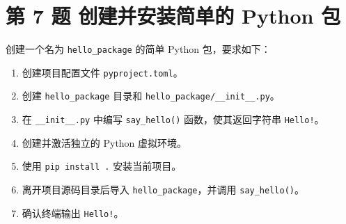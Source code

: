 \documentclass[a4paper,12pt]{report}
\begin{document}
\section{第 7 题 创建并安装简单的 Python 包}


创建一个名为 \texttt{hello\_package} 的简单 Python 包，要求如下：

\begin{enumerate}
  \item 创建项目配置文件 \texttt{pyproject.toml}。
  \item 创建 \texttt{hello\_package} 目录和 \texttt{hello\_package/\_\_init\_\_.py}。
  \item 在 \texttt{\_\_init\_\_.py} 中编写 \texttt{say\_hello()} 函数，使其返回字符串
  \texttt{Hello!}。
  \item 创建并激活独立的 Python 虚拟环境。
  \item 使用 \texttt{pip install .} 安装当前项目。
  \item 离开项目源码目录后导入 \texttt{hello\_package}，并调用 \texttt{say\_hello()}。
  \item 确认终端输出 \texttt{Hello!}。
\end{enumerate}

\end{document}
